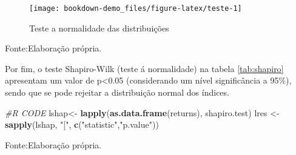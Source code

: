 \documentclass[
  12pt,
  a4paper,
  openany]{book}
\newenvironment{Shaded}{\begin{snugshade}}{\end{snugshade}}
\newcommand{\CommentTok}[1]{\textcolor[rgb]{0.56,0.35,0.01}{\textit{#1}}}
\newcommand{\KeywordTok}[1]{\textcolor[rgb]{0.13,0.29,0.53}{\textbf{#1}}}
\newcommand{\NormalTok}[1]{#1}
\newcommand{\StringTok}[1]{\textcolor[rgb]{0.31,0.60,0.02}{#1}}
\begin{document}
\begin{figure}

{\centering \texttt{[image: bookdown-demo\_files/figure-latex/teste-1]} 

}

\caption{Teste a normalidade das distribuições}\label{fig:teste}
\end{figure}
\FloatBarrier
\centering

Fonte:Elaboração própria.

\justifying
\bigskip

Por fim, o teste Shapiro-Wilk (teste á normalidade) na tabela \ref{tab:shapiro} apresentam um valor de p\textless0.05 (considerando um nível significância a 95\%), sendo que se pode rejeitar a distribuição normal dos índices.

\scriptsize

\begin{Shaded}
\begin{Highlighting}[]
\CommentTok{\#R CODE}
\NormalTok{lshap\textless{}{-}}\StringTok{ }\KeywordTok{lapply}\NormalTok{(}\KeywordTok{as.data.frame}\NormalTok{(returns), shapiro.test)}
\NormalTok{lres \textless{}{-}}\StringTok{ }\KeywordTok{sapply}\NormalTok{(lshap, }\StringTok{"["}\NormalTok{, }\KeywordTok{c}\NormalTok{(}\StringTok{"statistic"}\NormalTok{,}\StringTok{"p.value"}\NormalTok{))}
\end{Highlighting}
\end{Shaded}

\normalsize

\begin{table}[!h]

\caption{\label{tab:shapiro}Teste normalidade Shapiro-Wilk}
\centering
{}
\end{table}
\FloatBarrier
\centering

Fonte:Elaboração própria.

\justifying
\bigskip

\newpage
\end{document}
